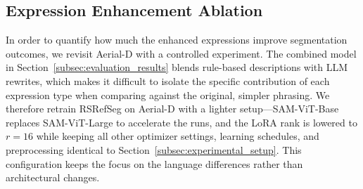 \begin{table}[t]
\centering
\caption{Cross-dataset validation results for RSRefSeg variants (ours) and published baselines (historic scores in \textcolor{blue}{blue}; ``--'' indicates metrics not reported in the cited work).}
\label{tab:combined_training_results}
\end{table}

\subsection{Expression Enhancement Ablation}
\label{subsec:ablation_studies}

In order to quantify how much the enhanced expressions improve segmentation outcomes, we revisit Aerial-D with a controlled experiment. The combined model in Section~\ref{subsec:evaluation_results} blends rule-based descriptions with LLM rewrites, which makes it difficult to isolate the specific contribution of each expression type when comparing against the original, simpler phrasing. We therefore retrain RSRefSeg on Aerial-D with a lighter setup—SAM-ViT-Base replaces SAM-ViT-Large to accelerate the runs, and the LoRA rank is lowered to \(r=16\) while keeping all other optimizer settings, learning schedules, and preprocessing identical to Section~\ref{subsec:experimental_setup}. This configuration keeps the focus on the language differences rather than architectural changes.

